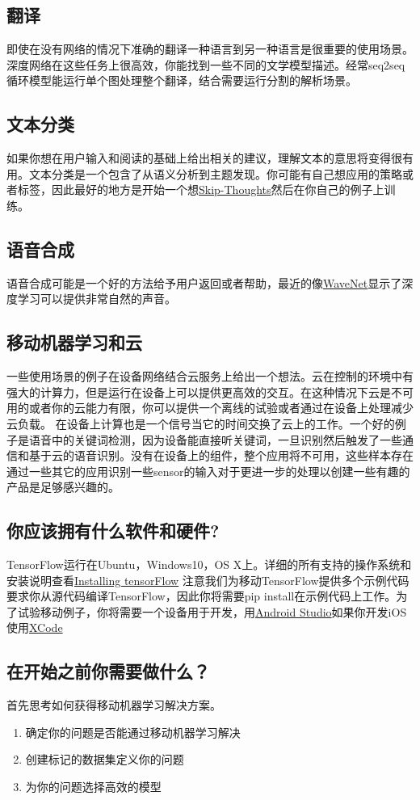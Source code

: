 \subsection{翻译}
即使在没有网络的情况下准确的翻译一种语言到另一种语言是很重要的使用场景。深度网络在这些任务上很高效，你能找到一些不同的文学模型描述。经常seq2seq循环模型能运行单个图处理整个翻译，结合需要运行分割的解析场景。
\subsection{文本分类}
如果你想在用户输入和阅读的基础上给出相关的建议，理解文本的意思将变得很有用。文本分类是一个包含了从语义分析到主题发现。你可能有自己想应用的策略或者标签，因此最好的地方是开始一个想\href{https://github.com/tensorflow/models/tree/master/skip_thoughts/}{Skip-Thoughts}然后在你自己的例子上训练。
\subsection{语音合成}
语音合成可能是一个好的方法给予用户返回或者帮助，最近的像\href{https://deepmind.com/blog/wavenet-generative-model-raw-audio/}{WaveNet}显示了深度学习可以提供非常自然的声音。
\subsection{移动机器学习和云}
一些使用场景的例子在设备网络结合云服务上给出一个想法。云在控制的环境中有强大的计算力，但是运行在设备上可以提供更高效的交互。在这种情况下云是不可用的或者你的云能力有限，你可以提供一个离线的试验或者通过在设备上处理减少云负载。
在设备上计算也是一个信号当它的时间交换了云上的工作。一个好的例子是语音中的关键词检测，因为设备能直接听关键词，一旦识别然后触发了一些通信和基于云的语音识别。没有在设备上的组件，整个应用将不可用，这些样本存在通过一些其它的应用识别一些sensor的输入对于更进一步的处理以创建一些有趣的产品是足够感兴趣的。
\subsection{你应该拥有什么软件和硬件?}
TensorFlow运行在Ubuntu，Windows10，OS X上。详细的所有支持的操作系统和安装说明查看\href{https://www.tensorflow.org/install/index?hl=zh-cn}{Installing tensorFlow}
注意我们为移动TensorFlow提供多个示例代码要求你从源代码编译TensorFlow，因此你将需要pip install在示例代码上工作。为了试验移动例子，你将需要一个设备用于开发，用\href{https://developer.android.com/studio/install.html?hl=zh-cn}{Android Studio}如果你开发iOS使用\href{https://developer.apple.com/xcode/}{XCode}
\subsection{在开始之前你需要做什么？}
首先思考如何获得移动机器学习解决方案。
\begin{enumerate}
    \item 确定你的问题是否能通过移动机器学习解决
    \item 创建标记的数据集定义你的问题
    \item 为你的问题选择高效的模型
\end{enumerate}
